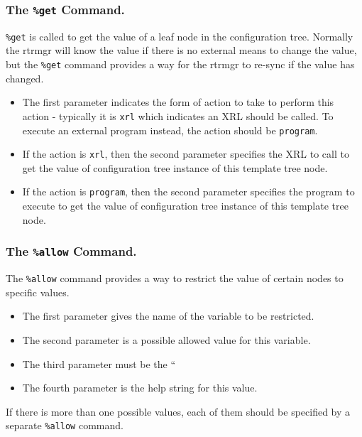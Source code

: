 \documentclass[11pt]{article}
\begin{document}
\subsubsection{The {\tt \%get} Command.}
{\tt \%get} is called to get the value of a leaf node in the
configuration tree.  Normally the rtrmgr will know the value if there
is no external means to change the value, but the {\tt \%get} command
provides a way for the rtrmgr to re-sync if the value has changed.

\begin{itemize}
  \item The first parameter indicates the form of action to take to perform
   this action - typically it is {\tt xrl} which indicates an XRL should
   be called.
   To execute an external program instead, the action should be {\tt program}.

  \item If the action is {\tt xrl}, then the second parameter specifies the
   XRL to call to get the value of configuration tree instance of this template
   tree node.

  \item If the action is {\tt program}, then the second parameter specifies the
   program to execute to get the value of configuration tree instance of this
   template tree node.

\end{itemize}

\subsubsection{The {\tt \%allow} Command.}
The {\tt \%allow} command provides a way to restrict the value of
certain nodes to specific values.

\begin{itemize}

  \item The first parameter gives the name of the variable to be restricted.

  \item The second parameter is a possible allowed value for this variable.

  \item The third parameter must be the ``%

  \item The fourth parameter is the help string for this value.
\end{itemize}

If there is more than one possible values, each of them should be
specified by a separate {\tt \%allow} command.
\end{document}
